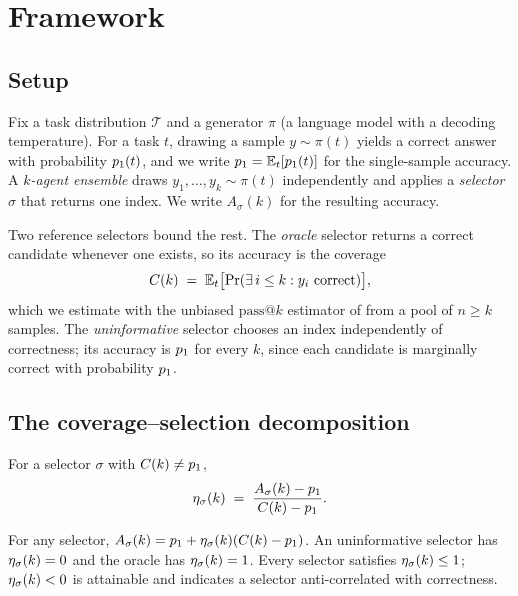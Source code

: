 \section{Framework}
\label{sec:framework}

\subsection{Setup}

Fix a task distribution $\mathcal{T}$ and a generator $\pi$ (a language model
with a decoding temperature). For a task $t$, drawing a sample $y \sim \pi(t)$
yields a correct answer with probability $p_1(t)$, and we write
$p_1 = \mathbb{E}_t[p_1(t)]$ for the single-sample accuracy. A
\emph{$k$-agent ensemble} draws $y_1,\dots,y_k \sim \pi(t)$ independently and
applies a \emph{selector} $\sigma$ that returns one index. We write
$A_\sigma(k)$ for the resulting accuracy.

Two reference selectors bound the rest. The \emph{oracle} selector returns a
correct candidate whenever one exists, so its accuracy is the coverage
\begin{equation}
C(k) \;=\; \mathbb{E}_t\bigl[\Pr(\exists\, i \le k : y_i \text{ correct})\bigr],
\end{equation}
which we estimate with the unbiased $\mathrm{pass}@k$ estimator of
\citet{chen2021codex} from a pool of $n \ge k$ samples. The
\emph{uninformative} selector chooses an index independently of correctness;
its accuracy is $p_1$ for every $k$, since each candidate is marginally
correct with probability $p_1$.

\subsection{The coverage--selection decomposition}

\begin{definition}
For a selector $\sigma$ with $C(k) \neq p_1$,
\begin{equation}
\eta_\sigma(k) \;=\; \frac{A_\sigma(k) - p_1}{C(k) - p_1}.
\label{eq:eta}
\end{equation}
\end{definition}

\begin{proposition}[Decomposition]
\label{prop:decomp}
For any selector, $A_\sigma(k) = p_1 + \eta_\sigma(k)(C(k)-p_1)$.
An uninformative selector has $\eta_\sigma(k)=0$ and the oracle has
$\eta_\sigma(k)=1$. Every selector satisfies $\eta_\sigma(k) \le 1$;
$\eta_\sigma(k) < 0$ is attainable and indicates a selector anti-correlated
with correctness.
\end{proposition}

